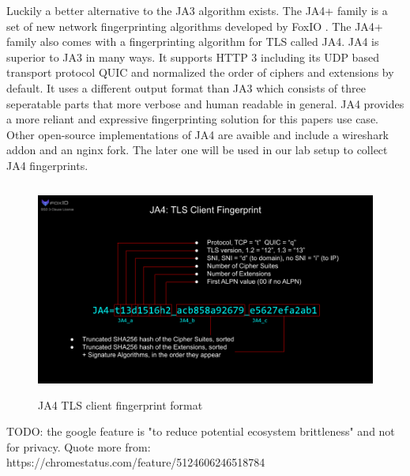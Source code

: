 \documentclass[12pt]{report}
\begin{document}
Luckily a better alternative to the JA3 algorithm exists. The JA4+ family is a set of new network fingerprinting algorithms developed by FoxIO \cite{foxIOJa4}.
The JA4+ family also comes with a fingerprinting algorithm for TLS called JA4. JA4 is superior to JA3 in many ways. It supports HTTP 3 including its UDP based transport protocol QUIC and normalized the order of ciphers and extensions by default. It uses a different output format than JA3 which consists of three seperatable parts that more verbose and human readable in general. JA4 provides a more reliant and expressive fingerprinting solution for this papers use case. Other open-source implementations of JA4 are avaible and include a wireshark addon and an nginx fork. The later one will be used in our lab setup to collect JA4 fingerprints.

\begin{figure}[!htb]
  \centering
  \includegraphics[height=7cm]{./images/JA4.png}
  \caption{JA4 TLS client fingerprint format}
\end{figure}

TODO: the google feature is "to reduce potential ecosystem brittleness" and not for privacy. Quote more from:
https://chromestatus.com/feature/5124606246518784

\newpage
\end{document}
